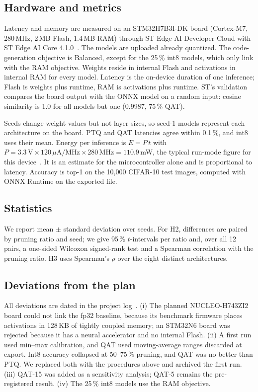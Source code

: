 \documentclass[conference]{IEEEtran}
\begin{document}
\subsection{Hardware and metrics}
Latency and memory are measured on an STM32H7B3I-DK board (Cortex-M7, 280\,MHz, 2\,MB Flash, 1.4\,MB RAM) through ST Edge AI Developer Cloud with ST Edge AI Core 4.1.0~\cite{stedgeai}. The models are uploaded already quantized. The code-generation objective is Balanced, except for the 25\,\% int8 models, which only link with the RAM objective. Weights reside in internal Flash and activations in internal RAM for every model. Latency is the on-device duration of one inference; Flash is weights plus runtime, RAM is activations plus runtime. ST's validation compares the board output with the ONNX model on a random input: cosine similarity is 1.0 for all models but one (0.9987, 75\,\% QAT).

Seeds change weight values but not layer sizes, so seed-1 models represent each architecture on the board. PTQ and QAT latencies agree within 0.1\,\%, and int8 uses their mean. Energy per inference is $E = P\,t$ with $P = 3.3\,\text{V} \times 120\,\mu\text{A/MHz} \times 280\,\text{MHz} = 110.9$\,mW, the typical run-mode figure for this device~\cite{stm32h7b3}. It is an estimate for the microcontroller alone and is proportional to latency. Accuracy is top-1 on the 10{,}000 CIFAR-10 test images, computed with ONNX Runtime on the exported file.

\subsection{Statistics}
We report mean $\pm$ standard deviation over seeds. For H2, differences are paired by pruning ratio and seed; we give 95\,\% $t$-intervals per ratio and, over all 12 pairs, a one-sided Wilcoxon signed-rank test and a Spearman correlation with the pruning ratio. H3 uses Spearman's $\rho$ over the eight distinct architectures.

\subsection{Deviations from the plan}
All deviations are dated in the project log~\cite{repo}. (i) The planned NUCLEO-H743ZI2 board could not link the fp32 baseline, because its benchmark firmware places activations in 128\,KB of tightly coupled memory; an STM32N6 board was rejected because it has a neural accelerator and no internal Flash. (ii) A first run used min--max calibration, and QAT used moving-average ranges discarded at export. Int8 accuracy collapsed at 50--75\,\% pruning, and QAT was no better than PTQ. We replaced both with the procedures above and archived the first run. (iii) QAT-15 was added as a sensitivity analysis; QAT-5 remains the pre-registered result. (iv) The 25\,\% int8 models use the RAM objective.
\end{document}
